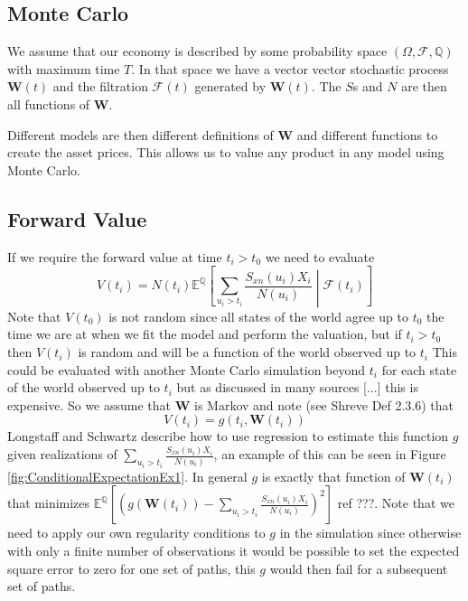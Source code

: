\documentclass[a4paper,10pt]{article}
\newcommand{\E}{\mathbb{E}}                 %
\newcommand{\Q}{\mathbb{Q}}                 %
\begin{document}
\subsection{Monte Carlo}
We assume that our economy is described by some probability space $(\Omega, \mathcal{F}, \Q)$ with maximum time $T$.  In that space we have a vector vector stochastic process $\textbf{W}(t)$ and the filtration $\mathcal{F}(t)$ generated by $\textbf{W}(t)$.  The $S$s and $N$ are then all functions of $\textbf{W}$.

Different models are then different definitions of $\textbf{W}$ and different functions to create the asset prices.  
This allows us to value any product in any model using Monte Carlo.

\subsection{Forward Value}
If we require the forward value at time $t_i > t_0$ we need to evaluate
\begin{equation}
V(t_i) = N(t_i)\E^\Q\left[ \sum_{u_i>t_i}{\frac{S_{xn}(u_i)X_i}{N(u_i)}} \middle| \mathcal{F}(t_i) \right]
\label{eq:fwdvalue1}
\end{equation}
Note that $V(t_0)$ is not random since all states of the world agree up to $t_0$ the time we are at when we fit the model and perform the valuation, but if $t_i>t_0$ then $V(t_i)$ is random and will be a function of the world observed up to $t_i$
This could be evaluated with another Monte Carlo simulation beyond $t_i$ for each state of the world observed up to $t_i$ but as discussed in many sources [...] this is expensive.  So we assume that $\textbf{W}$ is Markov and note (see Shreve \cite{Shreve} Def 2.3.6) that 
\begin{equation}
V(t_i) = g(t_i, \textbf{W}(t_i))
\label{eq:regress}
\end{equation}
Longstaff and Schwartz \cite{Longstaff01valuingamerican} describe how to use regression to estimate this function $g$ given realizations of $\sum_{u_i>t_i}{\frac{S_{xn}(u_i)X_i}{N(u_i)}}$, an example of this can be seen in Figure \ref{fig:ConditionalExpectationEx1}.  In general $g$ is exactly that function of $\textbf{W}(t_i)$ that minimizes $\E^\Q\left[ \left(g(\textbf{W}(t_i)) - \sum_{u_i>t_i}{\frac{S_{xn}(u_i)X_i}{N(u_i)}} \right)^2 \right]$ ref ???. Note that we need to apply our own regularity conditions to $g$ in the simulation since otherwise with only a finite number of observations it would be possible to set the expected square error to zero for one set of paths, this $g$ would then fail for a subsequent set of paths.
\end{document}
